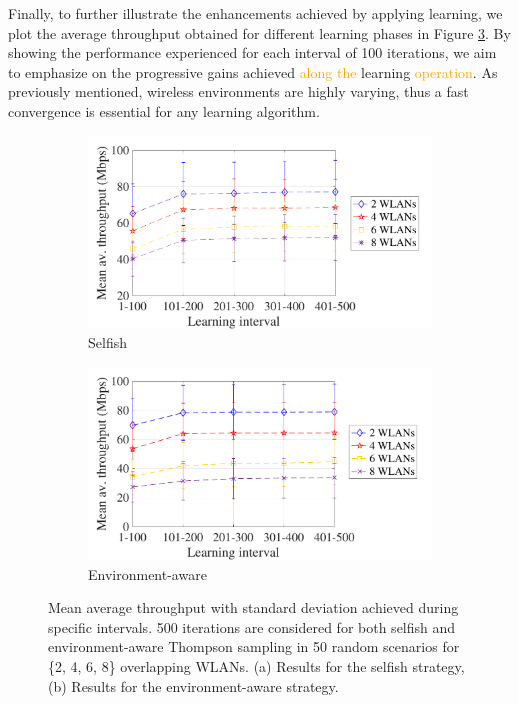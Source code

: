 \documentclass[preprint,12pt]{elsarticle}
\begin{document}
Finally, to further illustrate the enhancements achieved by applying learning, we plot the average throughput obtained for different learning phases in Figure \ref{fig:cumulative_tpt}. By showing the performance experienced for each interval of 100 iterations, we aim to emphasize on the progressive gains achieved \textcolor{orange}{along the} learning \textcolor{orange}{operation}. As previously mentioned, wireless environments are highly varying, thus a fast convergence is essential for any learning algorithm.

\begin{figure}[h!]
	\centering
	\begin{subfigure}[b]{0.4\textwidth}
		\includegraphics[width=\textwidth]{scalability_selfish_learning_iterations}
		\caption{Selfish}
		\label{fig:scalability_selfish_accumulated}
	\end{subfigure}
	\begin{subfigure}[b]{0.4\textwidth}
		\includegraphics[width=\textwidth]{scalability_informed_learning_iterations}
		\caption{Environment-aware}
		\label{fig:scalability_informed_accumulated}
	\end{subfigure}
	\caption{Mean average throughput with standard deviation achieved during specific intervals. 500 iterations are considered for both selfish and environment-aware Thompson sampling in 50 random scenarios for \{2, 4, 6, 8\} overlapping WLANs. (a) Results for the selfish strategy, (b) Results for the environment-aware strategy.}
	\label{fig:cumulative_tpt}
\end{figure}
\end{document}
